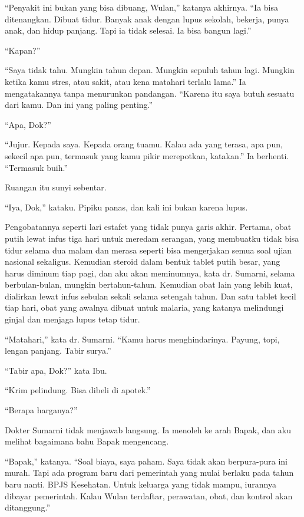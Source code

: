 \documentclass[11pt,twoside,openany]{book}
\makeatletter
\newcommand{\scenebreak}{\par\vspace{0.9em}{\centering\textsc{*\hspace{0.7em}*\hspace{0.7em}*}\par}\vspace{0.9em}\@afterindentfalse\@afterheading}
\makeatother
\begin{document}
``Penyakit ini bukan yang bisa dibuang, Wulan,'' katanya akhirnya. ``Ia bisa ditenangkan. Dibuat tidur. Banyak anak dengan lupus sekolah, bekerja, punya anak, dan hidup panjang. Tapi ia tidak selesai. Ia bisa bangun lagi.''

``Kapan?''

``Saya tidak tahu. Mungkin tahun depan. Mungkin sepuluh tahun lagi. Mungkin ketika kamu stres, atau sakit, atau kena matahari terlalu lama.'' Ia mengatakannya tanpa menurunkan pandangan. ``Karena itu saya butuh sesuatu dari kamu. Dan ini yang paling penting.''

``Apa, Dok?''

``Jujur. Kepada saya. Kepada orang tuamu. Kalau ada yang terasa, apa pun, sekecil apa pun, termasuk yang kamu pikir merepotkan, katakan.'' Ia berhenti. ``Termasuk buih.''

Ruangan itu sunyi sebentar.

``Iya, Dok,'' kataku. Pipiku panas, dan kali ini bukan karena lupus.

\scenebreak
Pengobatannya seperti lari estafet yang tidak punya garis akhir. Pertama, obat putih lewat infus tiga hari untuk meredam serangan, yang membuatku tidak bisa tidur selama dua malam dan merasa seperti bisa mengerjakan semua soal ujian nasional sekaligus. Kemudian steroid dalam bentuk tablet putih besar, yang harus diminum tiap pagi, dan aku akan meminumnya, kata dr. Sumarni, selama berbulan-bulan, mungkin bertahun-tahun. Kemudian obat lain yang lebih kuat, dialirkan lewat infus sebulan sekali selama setengah tahun. Dan satu tablet kecil tiap hari, obat yang awalnya dibuat untuk malaria, yang katanya melindungi ginjal dan menjaga lupus tetap tidur.

``Matahari,'' kata dr. Sumarni. ``Kamu harus menghindarinya. Payung, topi, lengan panjang. Tabir surya.''

``Tabir apa, Dok?'' kata Ibu.

``Krim pelindung. Bisa dibeli di apotek.''

``Berapa harganya?''

Dokter Sumarni tidak menjawab langsung. Ia menoleh ke arah Bapak, dan aku melihat bagaimana bahu Bapak mengencang.

``Bapak,'' katanya. ``Soal biaya, saya paham. Saya tidak akan berpura-pura ini murah. Tapi ada program baru dari pemerintah yang mulai berlaku pada tahun baru nanti. BPJS Kesehatan. Untuk keluarga yang tidak mampu, iurannya dibayar pemerintah. Kalau Wulan terdaftar, perawatan, obat, dan kontrol akan ditanggung.''
\end{document}

